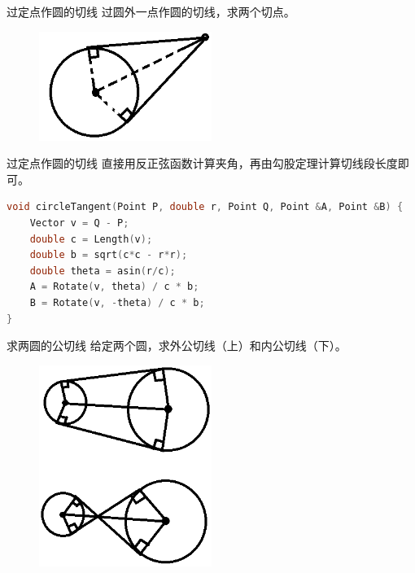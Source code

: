 \documentclass{beamer}
\begin{document}
\begin{frame}{过定点作圆的切线}
    \small
    过圆外一点作圆的切线，求两个切点。
    \begin{figure}[H]
        \centering
        \includegraphics[width=0.5\textwidth]{pic/tangent.png}
    \end{figure}
\end{frame}

\begin{frame}[fragile]{过定点作圆的切线}
    \small
    直接用反正弦函数计算夹角，再由勾股定理计算切线段长度即可。
    \begin{lstlisting}[language=c++]
void circleTangent(Point P, double r, Point Q, Point &A, Point &B) {
    Vector v = Q - P;
    double c = Length(v);
    double b = sqrt(c*c - r*r);
    double theta = asin(r/c);
    A = Rotate(v, theta) / c * b;
    B = Rotate(v, -theta) / c * b;
}
    \end{lstlisting}
\end{frame}

\begin{frame}{求两圆的公切线}
    \small
    给定两个圆，求外公切线（上）和内公切线（下）。
    \begin{figure}[H]
        \centering
        \includegraphics[width=0.5\textwidth]{pic/tangentTwoCircle.png}
    \end{figure}
\end{frame}
\end{document}
